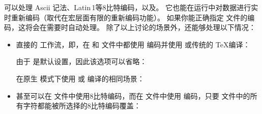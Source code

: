 
\biber 可以处理 Ascii 记法、Latin\,1等8比特编码，以及\utf。
它也能在运行中对数据进行实时重新编码（取代\biblatex 在宏层面有限的重新编码功能）。
如果你能正确指定  文件的编码，这将会在需要时自动处理。
除了以上讨论的场景外，\biber 还能够处理以下情况：

\begin{itemize}

\item
直接的 \utf 工作流，即，在  和  文件中都使用 \utf 编码并使用 \pdfTeX 或传统的 \TeX 编译：

\begin{ltxexample}
\usepackage[utf8]{inputenc}
\usepackage[bibencoding=auto]{biblatex}
\end{ltxexample}
%
由于  是默认设置，因此该选项可以省略：

\begin{ltxexample}
\usepackage[utf8]{inputenc}
\usepackage{biblatex}
\end{ltxexample}

在原生 \utf 模式下使用 \XeTeX 或 \LuaTeX 编译的相同场景：

\begin{ltxexample}
\usepackage{biblatex}
\end{ltxexample}

\item
甚至可以在  文件中使用8比特编码，而在  文件中使用 \utf 编码，只要  文件中的所有字符都能被所选择的8比特编码覆盖：

\begin{ltxexample}
\usepackage[latin1]{inputenc}
\usepackage[bibencoding=utf8]{biblatex}
\end{ltxexample}

\end{itemize}


